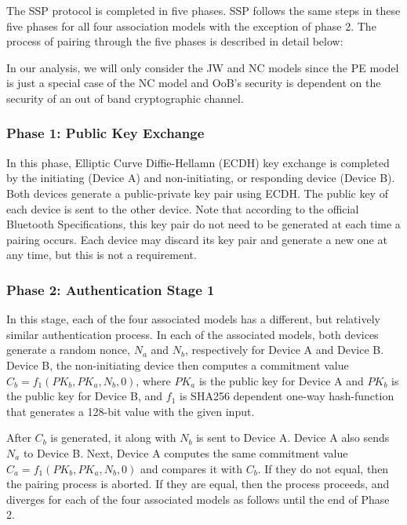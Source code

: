 \documentclass{acm_proc_article-sp}
\begin{document}
The SSP protocol is completed in five phases. SSP follows the same steps in these five phases for all four association models with the exception of phase 2. The process of pairing through the five phases is described in detail below:

In our analysis, we will only consider the JW and NC models since the PE model is just a special case of the NC model and OoB's security is dependent on the security of an out of band cryptographic channel.

\subsubsection{Phase 1: Public Key Exchange}
In this phase, Elliptic Curve Diffie-Hellamn (ECDH) key exchange is completed by the initiating (Device A) and non-initiating, or responding device (Device B). Both devices generate a public-private key pair using ECDH. The public key of each device is sent to the other device. Note that according to the official Bluetooth Specifications, this key pair do not need to be generated at each time a pairing occurs. Each device may discard its key pair and generate a new one at any time, but this is not a requirement.

\subsubsection{Phase 2: Authentication Stage 1}
In this stage, each of the four associated models has a different, but relatively similar authentication process. In each of the associated models, both devices generate a random nonce, $N_a$ and $N_b$, respectively for Device A and Device B. Device B, the non-initiating device then computes a commitment value $C_b = f_1(PK_b, PK_a, N_b, 0)$, where $PK_a$ is the public key for Device A and $PK_b$ is the public key for Device B, and $f_1$ is SHA256 dependent one-way hash-function that generates a 128-bit value with the given input.

After $C_b$ is generated, it along with $N_b$ is sent to Device A. Device A also sends $N_a$ to Device B. Next, Device A computes the same commitment value $C_a = f_1(PK_b, PK_a, N_b, 0)$ and compares it with $C_b$. If they do not equal, then the pairing process is aborted. If they are equal, then the process proceeds, and diverges for each of the four associated models as follows until the end of Phase 2.
\end{document}
